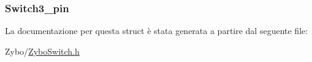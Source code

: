 \hypertarget{struct_zybo_switch__t_a6b95420b88fe8c1fd7f347ce3ae1906b}{
\subsubsection[{Switch3\+\_\+pin}]{ Switch3\+\_\+pin}}\label{struct_zybo_switch__t_a6b95420b88fe8c1fd7f347ce3ae1906b}


La documentazione per questa struct è stata generata a partire dal seguente file\+:\begin{DoxyCompactItemize}
\item 
Zybo/\hyperlink{_zybo_switch_8h}{Zybo\+Switch.\+h}\end{DoxyCompactItemize}
